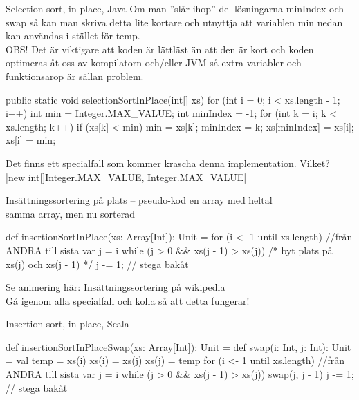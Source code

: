 \begin{Slide}{Selection sort, in place, Java}\SlideFontTiny
Om man ''slår ihop'' del-lösningarna minIndex och swap så kan man skriva detta lite kortare och utnyttja att variablen min nedan kan användas i stället för temp.  \\
OBS! Det är viktigare att koden är lättläst än att den är kort och koden optimeras åt oss av kompilatorn och/eller JVM så extra variabler och funktionsarop är sällan problem.
\begin{Code}[language=Java,basicstyle=\ttfamily\SlideFontSize{6}{7.5},numberstyle=\ttfamily\SlideFontSize{6}{8}, numbers=left]
public static void selectionSortInPlace(int[] xs) {
    for (int i = 0; i < xs.length - 1; i++) { 
        int min = Integer.MAX_VALUE;
        int minIndex = -1;
        for (int k = i; k < xs.length; k++) {  
            if (xs[k] < min) {
                min = xs[k];
                minIndex = k;
            }
        }
        xs[minIndex] = xs[i]; 
        xs[i] = min;          
    }
}
\end{Code}


\pause Det finns ett specialfall som kommer krascha denna implementation. Vilket?
\pause\\\jcode|new int[]{Integer.MAX_VALUE, Integer.MAX_VALUE}|
\end{Slide}

\begin{Slide}{Insättningssortering på plats -- pseudo-kod}
 en array med heltal\\
 samma array, men nu sorterad\\
\begin{Code}
def insertionSortInPlace(xs: Array[Int]): Unit = {
  for (i <- 1 until xs.length) {  //från ANDRA till sista
    var j = i
    while (j > 0 && xs(j - 1) > xs(j)) {
      /* byt plats på xs(j) och xs(j - 1) */
      j -= 1;  // stega bakåt
    }
  }
}
\end{Code}
\pause
Se animering här: \href{https://sv.wikipedia.org/wiki/Ins\%C3\%A4ttningssortering}{Insättningssortering på wikipedia}\\
Gå igenom alla specialfall och kolla så att detta fungerar!
\end{Slide}

\begin{Slide}{Insertion sort, in place, Scala}
\begin{Code}
def insertionSortInPlaceSwap(xs: Array[Int]): Unit = {
  def swap(i: Int, j: Int): Unit = {
    val temp = xs(i)
    xs(i) = xs(j)
    xs(j) = temp
  }
  for (i <- 1 until xs.length) {  //från ANDRA till sista
    var j = i
    while (j > 0 && xs(j - 1) > xs(j)) {
      swap(j, j - 1)
      j -= 1;  // stega bakåt
    }
  }
}
\end{Code}
\end{Slide}


